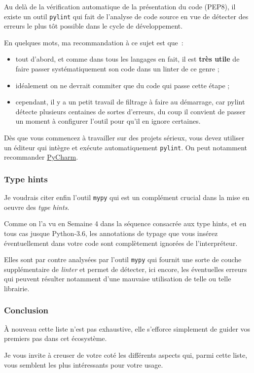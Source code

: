     Au delà de la vérification automatique de la présentation du code
(PEP8), il existe un outil \texttt{pylint} qui fait de l'analyse de code
source en vue de détecter des erreurs le plus tôt possible dans le cycle
de développement.

En quelques mots, ma recommandation à ce sujet est que~:

\begin{itemize}
\tightlist
\item
  tout d'abord, et comme dans tous les langages en fait, il est
  \textbf{très utile} de faire passer systématiquement son code dans un
  linter de ce genre ;
\item
  idéalement on ne devrait commiter que du code qui passe cette étape ;
\item
  cependant, il y a un petit travail de filtrage à faire au démarrage,
  car pylint détecte plusieurs centaines de sortes d'erreurs, du coup il
  convient de passer un moment à configurer l'outil pour qu'il en ignore
  certaines.
\end{itemize}

    Dès que vous commencez à travailler sur des projets sérieux, vous devez
utiliser un éditeur qui intègre et exécute automatiquement
\texttt{pylint}. On peut notamment recommander
\href{https://www.jetbrains.com/pycharm/}{PyCharm}.

    \hypertarget{type-hints}{%
\subsubsection{Type hints}\label{type-hints}}

    Je voudrais citer enfin l'outil \texttt{mypy} qui est un complément
crucial dans la mise en oeuvre des \emph{type hints}.

Comme on l'a vu en Semaine 4 dans la séquence consacrée aux type hints,
et en tous cas jusque Python-3.6, les annotations de typage que vous
insérez éventuellement dans votre code sont complètement ignorées de
l'interpréteur.

Elles sont par contre analysées par l'outil \texttt{mypy} qui fournit
une sorte de couche supplémentaire de \emph{linter} et permet de
détecter, ici encore, les éventuelles erreurs qui peuvent résulter
notamment d'une mauvaise utilisation de telle ou telle librairie.

    \hypertarget{conclusion}{%
\subsubsection{Conclusion}\label{conclusion}}

    À nouveau cette liste n'est pas exhaustive, elle s'efforce simplement de
guider vos premiers pas dans cet écosystème.

Je vous invite à creuser de votre coté les différents aspects qui, parmi
cette liste, vous semblent les plus intéressants pour votre usage.


    
    
    
